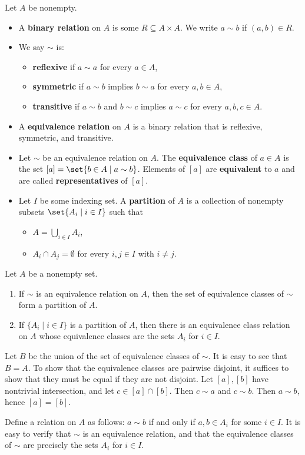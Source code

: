  Let $A$ be nonempty.
\begin{itemize}
    \item A \textbf{binary relation} on $A$ is some $R \subseteq A \times A$. We write $a \sim b$ if $(a, b) \in R$.
    \item We say $\sim$ is:
    \begin{itemize}
        \item \textbf{reflexive} if $a \sim a$ for every $a \in A$,
        \item \textbf{symmetric} if $a \sim b$ implies $b \sim a$ for every $a, b \in A$,
        \item \textbf{transitive} if $a \sim b$ and $b \sim c$ implies $a \sim c$ for every $a, b, c \in A$.
    \end{itemize}
    \item A \textbf{equivalence relation} on $A$ is a binary relation that is reflexive, symmetric, and transitive.
    \item Let $\sim$ be an equivalence relation on $A$. The \textbf{equivalence class} of $a \in A$ is the set $[a] = \set{b \in A \mid a \sim b}$. Elements of $[a]$ are \textbf{equivalent} to $a$ and are called \textbf{representatives} of $[a]$.
    \item Let $I$ be some indexing set. A \textbf{partition} of $A$ is a collection of nonempty subsets $\set{A_i \mid i \in I}$ such that
    \begin{itemize}
        \item $A = \bigcup_{i \in I} A_i$,
        \item $A_i \cap A_j = \emptyset$ for every $i, j \in I$ with $i \neq j$.
    \end{itemize}
\end{itemize}

 \label{prop0.2}
Let $A$ be a nonempty set.
\begin{enumerate}
    \item If $\sim$ is an equivalence relation on $A$, then the set of equivalence classes of $\sim$ form a partition of $A$.
    \item If $\{A_i \mid i \in I\}$ is a partition of $A$, then there is an equivalence class relation on $A$ whose equivalence classes are the sets $A_i$ for $i \in I$.
\end{enumerate}

\begin{proofnum}
    \item Let $B$ be the union of the set of equivalence classes of $\sim$. It is easy to see that $B = A$. To show that the equivalence classes are pairwise disjoint, it suffices to show that they must be equal if they are not disjoint. Let $[a], [b]$ have nontrivial intersection, and let $c \in [a] \cap [b]$. Then $c \sim a$ and $c \sim b$. Then $a \sim b$, hence $[a] = [b]$.
    \item Define a relation on $A$ as follows: $a \sim b$ if and only if $a, b \in A_i$ for some $i \in I$. It is easy to verify that $\sim$ is an equivalence relation, and that the equivalence classes of $\sim$ are precisely the sets $A_i$ for $i \in I$.
\end{proofnum}

